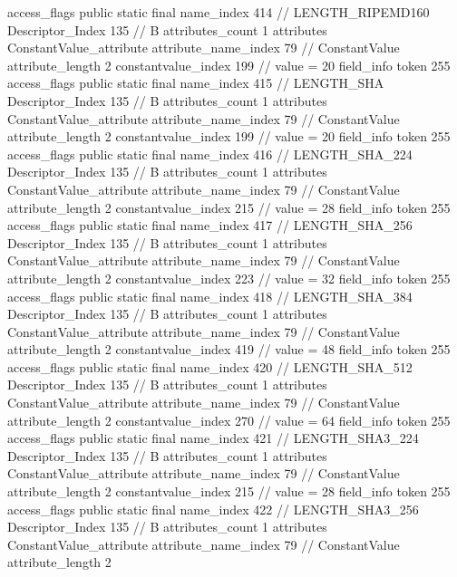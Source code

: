 {{{{{				access_flags	public static final
				name_index	414		// LENGTH_RIPEMD160
				Descriptor_Index	135		// B
				attributes_count	1
				attributes {
				ConstantValue_attribute {
					attribute_name_index	79		// ConstantValue
					attribute_length	2
					constantvalue_index	199		// value = 20
				}
				}
			}
			field_info {
				token	255
				access_flags	public static final
				name_index	415		// LENGTH_SHA
				Descriptor_Index	135		// B
				attributes_count	1
				attributes {
				ConstantValue_attribute {
					attribute_name_index	79		// ConstantValue
					attribute_length	2
					constantvalue_index	199		// value = 20
				}
				}
			}
			field_info {
				token	255
				access_flags	public static final
				name_index	416		// LENGTH_SHA_224
				Descriptor_Index	135		// B
				attributes_count	1
				attributes {
				ConstantValue_attribute {
					attribute_name_index	79		// ConstantValue
					attribute_length	2
					constantvalue_index	215		// value = 28
				}
				}
			}
			field_info {
				token	255
				access_flags	public static final
				name_index	417		// LENGTH_SHA_256
				Descriptor_Index	135		// B
				attributes_count	1
				attributes {
				ConstantValue_attribute {
					attribute_name_index	79		// ConstantValue
					attribute_length	2
					constantvalue_index	223		// value = 32
				}
				}
			}
			field_info {
				token	255
				access_flags	public static final
				name_index	418		// LENGTH_SHA_384
				Descriptor_Index	135		// B
				attributes_count	1
				attributes {
				ConstantValue_attribute {
					attribute_name_index	79		// ConstantValue
					attribute_length	2
					constantvalue_index	419		// value = 48
				}
				}
			}
			field_info {
				token	255
				access_flags	public static final
				name_index	420		// LENGTH_SHA_512
				Descriptor_Index	135		// B
				attributes_count	1
				attributes {
				ConstantValue_attribute {
					attribute_name_index	79		// ConstantValue
					attribute_length	2
					constantvalue_index	270		// value = 64
				}
				}
			}
			field_info {
				token	255
				access_flags	public static final
				name_index	421		// LENGTH_SHA3_224
				Descriptor_Index	135		// B
				attributes_count	1
				attributes {
				ConstantValue_attribute {
					attribute_name_index	79		// ConstantValue
					attribute_length	2
					constantvalue_index	215		// value = 28
				}
				}
			}
			field_info {
				token	255
				access_flags	public static final
				name_index	422		// LENGTH_SHA3_256
				Descriptor_Index	135		// B
				attributes_count	1
				attributes {
				ConstantValue_attribute {
					attribute_name_index	79		// ConstantValue
					attribute_length	2
}}}}}}}
